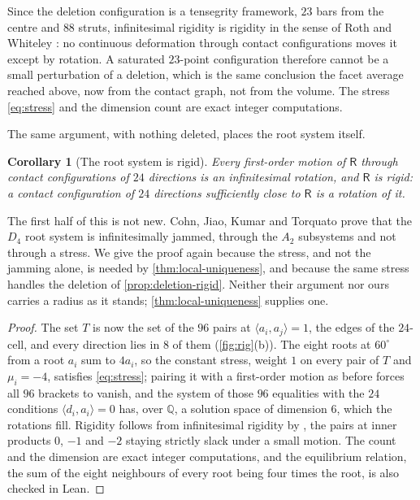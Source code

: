 \documentclass[11pt,reqno]{amsart}
\renewcommand{\_}{\origunderscore\allowbreak}
\numberwithin{equation}{section}
\theoremstyle{plain}
\newtheorem{cor}[thm]{Corollary}
\theoremstyle{definition}
\theoremstyle{remark}
\newcommand{\Rt}{\mathsf{R}}                 %
\begin{document}
Since the deletion configuration is a tensegrity framework, $23$ bars
from the centre and $88$ struts, infinitesimal rigidity is rigidity in
the sense of Roth and Whiteley \cite[Thm.~5.7]{RW81}: no continuous
deformation through contact configurations moves it except by rotation.
A saturated $23$-point configuration therefore cannot be a small
perturbation of a deletion, which is the same conclusion the facet
average reached above, now from the contact graph, not from the volume.
The stress \eqref{eq:stress} and the dimension count are exact integer
computations.

The same argument, with nothing deleted, places the root system itself.

\begin{cor}[The root system is rigid]\label{cor:root-rigid}
Every first-order motion of $\Rt$ through contact configurations of
$24$ directions is an infinitesimal rotation, and $\Rt$ is rigid: a
contact configuration of $24$ directions sufficiently close to $\Rt$
is a rotation of it.
\end{cor}

The first half of this is not new. Cohn, Jiao, Kumar and Torquato
\cite[Prop.~3.3]{CJKT11} prove that the $D_4$ root system is
infinitesimally jammed, through the $A_2$ subsystems and not through a stress. We give the proof again because the stress, and not
the jamming alone, is needed by \cref{thm:local-uniqueness}, and
because the same stress handles the deletion of
\cref{prop:deletion-rigid}. Neither their argument nor ours carries a
radius as it stands; \cref{thm:local-uniqueness} supplies one.

\begin{proof}
The set $T$ is now the set of the $96$ pairs at $\langle a_i,a_j\rangle=1$,
the edges of the $24$-cell, and every direction lies in $8$ of them
(\cref{fig:rig}(b)). The eight roots at $60^\circ$ from a root
$a_i$ sum to $4a_i$, so the constant stress, weight $1$ on every pair of
$T$ and $\mu_i=-4$, satisfies \eqref{eq:stress}; pairing it with a
first-order motion as before forces all $96$ brackets to vanish, and the
system of those $96$ equalities with the $24$ conditions
$\langle d_i,a_i\rangle=0$ has, over $\mathbb{Q}$, a solution space of
dimension $6$, which the rotations fill. Rigidity follows from
infinitesimal rigidity by \cite[Thm.~5.7]{RW81}, the pairs at inner
products $0$, $-1$ and $-2$ staying strictly slack under a small motion.
The count and the dimension are exact integer computations, and the
equilibrium relation, the sum of the eight neighbours of every root
being four times the root, is also checked in Lean.
\end{proof}
\end{document}
